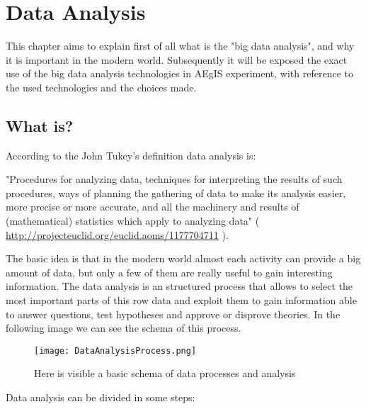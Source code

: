 
\chapter{Data Analysis} %

\label{Chapter2} %


This chapter aims to explain first of all what is the "big data analysis", and why it is important in the modern world. Subsequently it will be exposed the exact use of the big data analysis technologies in AEgIS experiment, with reference to the used technologies and the choices made.   


\section{What is?}
According to the John Tukey's definition data analysis is: 

"Procedures for analyzing data, techniques for interpreting the results of such procedures, ways of planning the gathering of data to make its analysis easier, more precise or more accurate, and all the machinery and results of (mathematical) statistics which apply to analyzing data" ( \url{http://projecteuclid.org/euclid.aoms/1177704711} ).

The basic idea is that in the modern world almost each activity can provide a big amount of data, but only a few of them are really useful to gain interesting information. The data analysis is an structured process that allows to select the most important parts of this row data and exploit them to gain information able to answer questions, test hypotheses and approve or disprove theories.
In the following image we can see the schema of this process. 

\begin{figure}[H]
\centering
\texttt{[image: DataAnalysisProcess.png]} 
\caption{Here is visible a basic schema of data processes and analysis}
\end{figure}

Data analysis can be divided in some steps:

